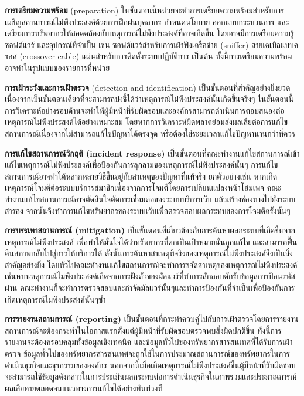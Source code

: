 \documentclass[../th_cyber_warfare_distilled.tex]{subfiles}
\begin{document}
\textbf{การเตรียมความพร้อม }(preparation) ในขั้นตอนนี้หน่วยจะทำการเตรียมความพร้อมสำหรับการเผชิญสถานการณ์ไม่พึงประสงค์ด้วยการฝึกฝนบุคลากร กำหนดนโยบาย ออกแบบกระบวนการ และเตรียมการทรัพยากรให้สอดคล้องกับเหตุการณ์ไม่พึงประสงค์ที่อาจเกิดขึ้น โดยอาจมีการเตรียมความรู้ ซอฟต์แวร์ และอุปกรณ์ที่จำเป็น เช่น ซอฟต์แวร์สำหรับการเฝ้าฟังเครือข่าย (sniffer) สายเคเบิลแบบครอส (crossover cable) แผ่นสำหรับการติดตั้งระบบปฏิบัติการ เป็นต้น ทั้งนี้การเตรียมความพร้อมอาจทำในรูปแบบของรายการที่หน่วย



\textbf{การเฝ้าระวังและการเฝ้าตรวจ }(detection and identification) เป็นขั้นตอนที่สำคัญอย่างยิ่งยวดเนื่องจากเป็นขั้นตอนเดียวที่จะสามารถบ่งชี้ได้ว่าเหตุการณ์ไม่พึงประสงค์นั้นเกิดขึ้นจริงๆ ในขั้นตอนนี้การวิเคราะห์อย่างรอบด้านจะทำให้ผู้มีหน้าที่รับผิดชอบและองค์กรสามารถดำเนินการตอบสนองต่อเหตุการณ์ไม่พึงประสงค์ได้อย่างเหมาะสม โดยหากการวิเคราะห์ผิดพลาดย่อมส่งผลเสียต่อการแก้ไขสถานการณ์เนื่องจากไม่สามารถแก้ไขปัญหาได้ตรงจุด หรือต้องใช้ระยะเวลาแก้ไขปัญหานานกว่าที่ควร

\textbf{การแก้ไขสถานการณ์วิกฤติ (incident response)} เป็นขั้นตอนที่คณะทำงานแก้ไขสถานการณ์เข้าแก้ไขเหตุการณ์ไม่พึงประสงค์เพื่อป้องกันการลุกลามของเหตุการณ์ไม่พึงประสงค์นั้นๆ การแก้ไขสถานการณ์อาจทำได้หลากหลายวิธีขึ้นอยู่กับสาเหตุของปัญหาที่แท้จริง ยกตัวอย่างเช่น หากเกิดเหตุการณ์โจมตีต่อระบบบริการสมาชิกเนื่องจากการโจมตีโดยการเปลี่ยนแปลงหน้าโฮมเพจ คณะทำงานแก้ไขสถานการณ์อาจตัดสินใจตัดการเชื่อมต่อของระบบบริการเว็บ แล้วสร้างช่องทางไปยังระบบสำรอง จากนั้นจึงทำการแก้ไขทรัพยากรของระบบเว็บเพื่อตรวจสอบผลกระทบของการโจมตีครั้งนั้นๆ 

\textbf{การบรรเทาสถานการณ์ (mitigation)} เป็นขั้นตอนที่เกี่ยวข้องกับการค้นหาผลกระทบที่เกิดขึ้นจากเหตุการณ์ไม่พึงประสงค์ เพื่อทำให้มั่นใจได้ว่าทรัพยากรที่ตกเป็นเป้าหมายนั้นถูกแก้ไข และสามารถฟื้นคืนสภาพกลับไปสู่การให้บริการได้ ดังนั้นการค้นหาสาเหตุที่จริงของเหตุการณ์ไม่พึงประสงค์จึงเป็นสิ่งสำคัญอย่างยิ่ง โดยทั่วไปคณะทำงานแก้ไขสถานการณ์จะทำการขจัดสาเหตุของเหตุการณ์ไม่พึงประสงค์ เช่นหากเหตุการณ์ไม่พึงประสงค์เกิดจากการฝังตัวของมัลแวร์ที่ทำการลักลอบดักรับข้อมูลการป้อนรหัสผ่าน คณะทำงานก็จะทำการตรวจสอบและกำจัดมัลแวร์นั้นๆและทำการป้องกันที่จำเป็นเพื่อป้องกันการเกิดเหตุการณ์ไม่พึงประสงค์นั้นๆซ้ำ

\textbf{การรายงานสถานการณ์ (reporting)} เป็นขั้นตอนที่กระทำควบคู่ไปกับการเฝ้าตรวจโดยการรายงานสถานการณ์จะต้องกระทำในโอกาสแรกตั้งแต่ผู้มีหน้าที่รับผิดชอบตรวจพบสิ่งผิดปกติขึ้น ทั้งนี้การรายงานจะต้องครอบคลุมทั้งข้อมูลเชิงเทคนิค และข้อมูลทั่วไปของทรัพยากรสารสนเทศที่ได้รับการเฝ้าตรวจ ข้อมูลทั่วไปของทรัพยากรสารสนเทศจะถูกใช้ในการประมาณสถานการณ์ของทรัพยากรในการดำเนินธุรกิจและธุรกรรมขององค์กร นอกจากนี้เมื่อเกิดเหตุการณ์ไม่พึงประสงค์ขึ้นผู้มีหน้าที่รับผิดชอบจะสามารถใช้ข้อมูลดังกล่าวในการประเมินผลกระทบต่อการดำเนินธุรกิจในภาพรวมและประมาณการณ์ผลเสียหายตลอดจนแนวทางการแก้ไขได้อย่างทันท่วงที
\end{document}
